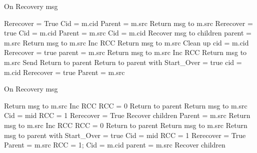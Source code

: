 \documentclass{article}
\begin{document}
\begin{algorithm}
\caption{On Recovery msg}
\label{Recovery message received}
\begin{algorithmic}[1]
		\State Rerecover = True
		\State Cid = m.cid
		\State Parent = m.src
	\Else
		\State Return msg to m.src
		\State Rerecover = true
		\State Cid = m.cid
		\State Parent = m.src
	\EndIf
{}
	\State Cid = m.cid
	\State Recover msg to children
	\State parent = m.src
			\State Return msg to m.src
			\State Inc RCC
			\State Return msg to m.src
				\State Clean up
			\EndIf
		\Else
			\State cid = m.cid
			\State Rerecover = true
			\State parent = m.src
		\EndIf
	\Else
			\State Return msg to m.src
			\State Inc RCC
			\State Return msg to m.src
				\State Send Return to parent
			\EndIf
		\Else
			\State Return to parent with Start\_Over = true
			\State cid = m.cid
			\State Rerecover = true
			\State Parent = m.src
		\EndIf
	\EndIf
{}
\end{algorithmic}
\end{algorithm}	

\begin{algorithm}
\caption{On Recovery msg}
\label{Recovery message received}
\begin{algorithmic}[1]
			\State Return msg to m.src
			\State Inc RCC
				\State RCC = 0
				\State Return to parent
			\EndIf
			\State Return msg to m.src
		\Else
			\State Cid = mid
			\State RCC = 1
				\State Rerecover = True	
			\Else 
				\State Recover children
			\EndIf
			\State Parent = m.src
		\EndIf
	\Else
			\State Return msg to m.src
			\State Inc RCC
				\State RCC = 0
				\State Return to parent
			\EndIf
			\State Return msg to m.src
		\Else
			\State Return msg to parent with Start\_Over = true
			\State Cid = mid
			\State RCC = 1
			\State Rerecover = True
			\State Parent = m.src
		\EndIf
	\EndIf
{}
	\State RCC = 1;
	\State Cid = m.cid
	\State parent = m.src
	\State Recover children
\EndIf
\EndProcedure
\end{algorithmic}
\end{algorithm}	
\end{document}
